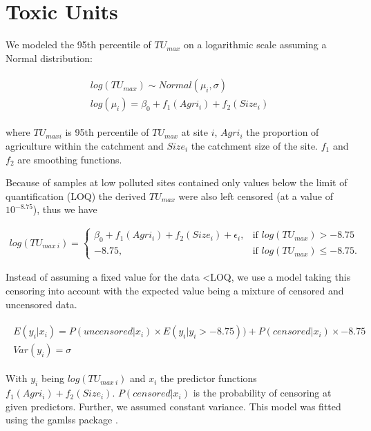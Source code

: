 \documentclass[pdftex,a4paper]{scrreprt}
\begin{document}
\pagebreak
\section{Toxic Units}

We modeled the 95th percentile of $TU_{max}$ on a logarithmic scale assuming a Normal distribution:

\begin{align}
\begin{split}
  log(TU_{max}) \sim Normal(\mu_i, \sigma) \\
  log(\mu_i)= \beta_0 + f_1(Agri_i) + f_2(Size_i)
\end{split}
\end{align}

where $TU_{max i}$ is 95th percentile of $TU_{max}$ at site $i$, $Agri_i$ the proportion of agriculture within the catchment and $Size_i$ the catchment size of the site.  
$f_1$ and $f_2$ are smoothing functions.

Because of samples at low polluted sites contained only values below the limit of quantification (LOQ) the derived $TU_{max}$ were also left censored (at a value of $10^{-8.75}$), thus we have

\begin{align}
  log(TU_{max~i})=\begin{cases}
    \beta_0 + f_1(Agri_i) + f_2(Size_i) + \epsilon_i, & \text{if $log(TU_{max}) > -8.75 $}\\
    -8.75, & \text{if $log(TU_{max}) \le -8.75 $}.
  \end{cases}
\end{align}


Instead of assuming a fixed value for the data \textless LOQ, we use a model taking this censoring into account \citep{helsel_fabricating_2006} with the expected value being a mixture of censored and uncensored data.

\begin{align}
\begin{split}
	E(y_i | x_i) = P(uncensored|x_i) \times E(y_i | y_i > -8.75)) + P(censored|x_i) \times -8.75\\
	Var(y_i) = \sigma
\end{split}
\end{align}

With $y_i$ being $log(TU_{max~i})$ and $x_i$ the predictor functions $f_1(Agri_i) + f_2(Size_i)$. $P(censored|x_i)$ is the probability of censoring at given predictors. Further, we assumed constant variance. This model was fitted using the gamlss package \citep{stasinopoulos_generalized_2007}.
\end{document}
